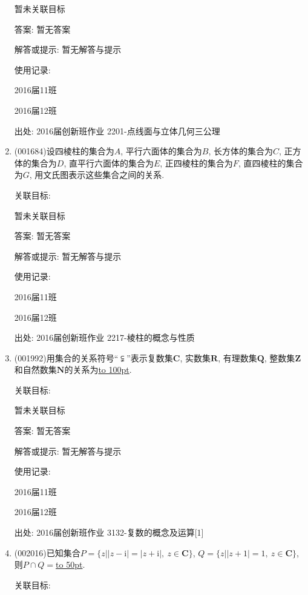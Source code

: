 \documentclass[10pt,a4paper]{article}
\newcommand{\blank}[1]{\underline{\hbox to #1pt{}}}
\begin{document}
\begin{enumerate}[1.]
暂未关联目标

答案: 暂无答案

解答或提示: 暂无解答与提示

使用记录:

2016届11班				

2016届12班				


出处: 2016届创新班作业	2201-点线面与立体几何三公理
\item { (001684)}设四棱柱的集合为$A$, 平行六面体的集合为$B$, 长方体的集合为$C$, 正方体的集合为$D$,
直平行六面体的集合为$E$, 正四棱柱的集合为$F$, 直四棱柱的集合为$G$, 用文氏图表示这些集合之间的关系.


关联目标:

暂未关联目标

答案: 暂无答案

解答或提示: 暂无解答与提示

使用记录:

2016届11班	

2016届12班	


出处: 2016届创新班作业	2217-棱柱的概念与性质
\item { (001992)}用集合的关系符号``$\subsetneqq$''表示复数集$\mathbf{C}$, 实数集$\mathbf{R}$, 有理数集$\mathbf{Q}$,
整数集$\mathbf{Z}$和自然数集$\mathbf{N}$的关系为\blank{100}.


关联目标:

暂未关联目标

答案: 暂无答案

解答或提示: 暂无解答与提示

使用记录:

2016届11班	

2016届12班	


出处: 2016届创新班作业	3132-复数的概念及运算[1]
\item { (002016)}已知集合$P=\{z||z-\mathrm{i}|=|z+\mathrm{i}|, \ z\in \mathbf{C}\}$, $Q=\{z||z+1|=1, \ z\in \mathbf{C}\}$, 则$P\cap Q=$\blank{50}.


关联目标:


\end{enumerate}
\end{document}
